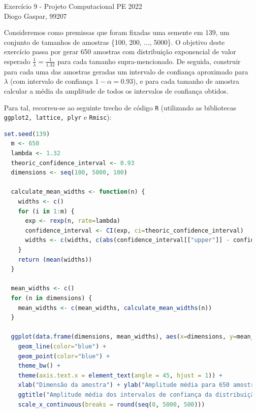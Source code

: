 \documentclass[11pt]{article}
\newcommand{\gaspar}{Diogo Gaspar, 99207}
\begin{document}
\begin{center}
{\huge{Exercício 9 - Projeto Computacional PE 2022}} \\
\vspace{1.5mm}
{\large{\gaspar}} \\
\end{center}

Consideremos como premissas que foram fixadas uma semente em 139, um conjunto de
tamanhos de amostras \{100, 200, ..., 5000\}.
O objetivo deste exercício passa por gerar 650 amostras com distribuição exponencial
de valor esperado $\frac{1}{\lambda} = \frac{1}{1.32}$ para cada tamanho supra-mencionado.
De seguida, construir para cada uma das amostras geradas um intervalo de confiança
aproximado para $\lambda$ (com intervalo de confiança $1 - \alpha = 0.93$), e para cada
tamanho de amostra calcular a média da amplitude de todos os intervalos de confiança
obtidos.

\vspace{0.5mm}
Para tal, recorreu-se ao seguinte trecho de código \texttt{R} (utilizando as bibliotecas \texttt{ggplot2, lattice, plyr} e \texttt{Rmisc}):

\begin{lstlisting}[language=R]
  set.seed(139)
  m <- 650
  lambda <- 1.32
  theoric_confidence_interval <- 0.93
  dimensions <- seq(100, 5000, 100)
  
  calculate_mean_widths <- function(n) {
    widths <- c()
    for (i in 1:m) {
      exp <- rexp(n, rate=lambda)
      confidence_interval <- CI(exp, ci=theoric_confidence_interval)
      widths <- c(widths, c(abs(confidence_interval[["upper"]] - confidence_interval[["lower"]])))
    }
    return (mean(widths))
  }
  
  mean_widths <- c()
  for (n in dimensions) {
    mean_widths <- c(mean_widths, calculate_mean_widths(n))
  }

  ggplot(data.frame(dimensions, mean_widths), aes(x=dimensions, y=mean_widths)) +
    geom_line(color="blue") +
    geom_point(color="blue") +
    theme_bw() +
    theme(axis.text.x = element_text(angle = 45, hjust = 1)) +
    xlab("Dimensão da amostra") + ylab("Amplitude média para 650 amostras") +
    ggtitle("Amplitude média dos intervalos de confiança da distribuição exponencial") +
    scale_x_continuous(breaks = round(seq(0, 5000, 500)))
\end{lstlisting}
\end{document}
